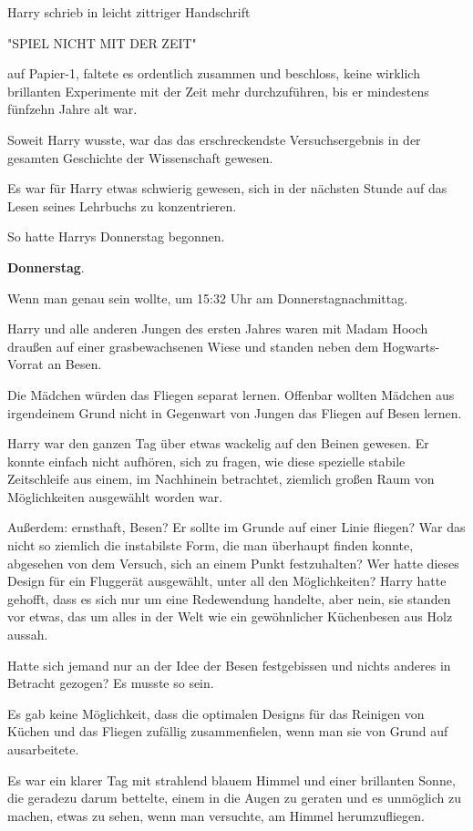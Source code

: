 {Harry schrieb in leicht zittriger Handschrift

"SPIEL NICHT MIT DER ZEIT"

auf Papier-1, faltete es ordentlich zusammen und beschloss, keine wirklich brillanten Experimente mit der Zeit mehr durchzuführen, bis er mindestens fünfzehn Jahre alt war.

Soweit Harry wusste, war das das erschreckendste Versuchsergebnis in der gesamten Geschichte der Wissenschaft gewesen.

Es war für Harry etwas schwierig gewesen, sich in der nächsten Stunde auf das Lesen seines Lehrbuchs zu konzentrieren.

So hatte Harrys Donnerstag begonnen.

\textbf{Donnerstag}.

Wenn man genau sein wollte, um 15:32 Uhr am Donnerstagnachmittag.

Harry und alle anderen Jungen des ersten Jahres waren mit Madam Hooch draußen auf einer grasbewachsenen Wiese und standen neben dem Hogwarts-Vorrat an Besen.

Die Mädchen würden das Fliegen separat lernen. Offenbar wollten Mädchen aus irgendeinem Grund nicht in Gegenwart von Jungen das Fliegen auf Besen lernen.

Harry war den ganzen Tag über etwas wackelig auf den Beinen gewesen. Er konnte einfach nicht aufhören, sich zu fragen, wie diese spezielle stabile Zeitschleife aus einem, im Nachhinein betrachtet, ziemlich großen Raum von Möglichkeiten ausgewählt worden war.

Außerdem: ernsthaft, Besen? Er sollte im Grunde auf einer Linie fliegen? War das nicht so ziemlich die instabilste Form, die man überhaupt finden konnte, abgesehen von dem Versuch, sich an einem Punkt festzuhalten? Wer hatte dieses Design für ein Fluggerät ausgewählt, unter all den Möglichkeiten? Harry hatte gehofft, dass es sich nur um eine Redewendung handelte, aber nein, sie standen vor etwas, das um alles in der Welt wie ein gewöhnlicher Küchenbesen aus Holz aussah.

Hatte sich jemand nur an der Idee der Besen festgebissen und nichts anderes in Betracht gezogen? Es musste so sein.

Es gab keine Möglichkeit, dass die optimalen Designs für das Reinigen von Küchen und das Fliegen zufällig zusammenfielen, wenn man sie von Grund auf ausarbeitete.

Es war ein klarer Tag mit strahlend blauem Himmel und einer brillanten Sonne, die geradezu darum bettelte, einem in die Augen zu geraten und es unmöglich zu machen, etwas zu sehen, wenn man versuchte, am Himmel herumzufliegen.

}
